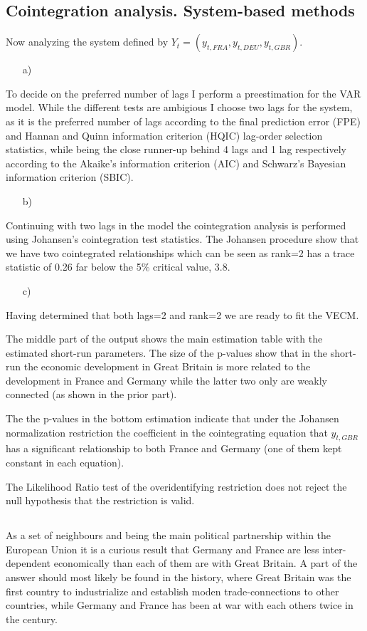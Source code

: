 \subsection{Cointegration analysis. System-based methods}
Now analyzing the system defined by $Y_t=(y_{t,FRA}, y_{t,DEU}, y_{t,GBR})$.
\begin{itemize}
  \item[a)]
\end{itemize}
To decide on the preferred number of lags I perform a preestimation for the VAR model. While the different tests are ambigious I choose two lags for the system, as it is the preferred number of lags according to the final prediction error (FPE) and Hannan and Quinn information criterion (HQIC) lag-order selection statistics, while being the close runner-up behind 4 lags and 1 lag respectively according to the Akaike's information criterion (AIC) and Schwarz's Bayesian information criterion (SBIC).
\begin{itemize}
  \item[b)]
\end{itemize}
Continuing with two lags in the model the cointegration analysis is performed using Johansen's cointegration test statistics. The Johansen procedure show that we have two cointegrated relationships which can be seen as rank=2 has a trace statistic of 0.26 far below the 5\% critical value, 3.8.
\begin{itemize}
  \item[c)]
\end{itemize}
Having determined that both lags=2 and rank=2 we are ready to fit the VECM.

The middle part of the output shows the main estimation table with the estimated short-run parameters. The size of the p-values show that in the short-run the economic development in Great Britain is more related to the development in France and Germany while the latter two only are weakly connected (as shown in the prior part).

The the p-values in the bottom estimation indicate that under the Johansen normalization restriction the coefficient in the cointegrating equation that $y_{t,GBR}$ has a significant relationship to both France and Germany (one of them kept constant in each equation).

The Likelihood Ratio test of the overidentifying restriction does not reject the null hypothesis that the restriction is valid.


\subsection{}
As a set of neighbours and being the main political partnership within the European Union it is a curious result that Germany and France are less inter-dependent economically than each of them are with Great Britain. A part of the answer should most likely be found in the history, where Great Britain was the first country to industrialize and establish moden trade-connections to other countries, while Germany and France has been at war with each others twice in the  century.
